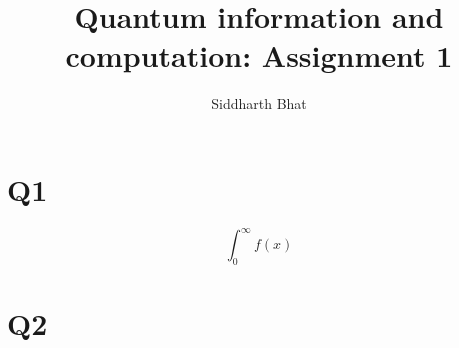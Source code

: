 \documentclass[11pt]{book}
\title{Quantum information and computation: Assignment 1}
\author{Siddharth Bhat}
\date{}
\begin{document}
\section{Q1}
$$ \int_0^\infty f(x) $$
\section{Q2}
\end{document}
